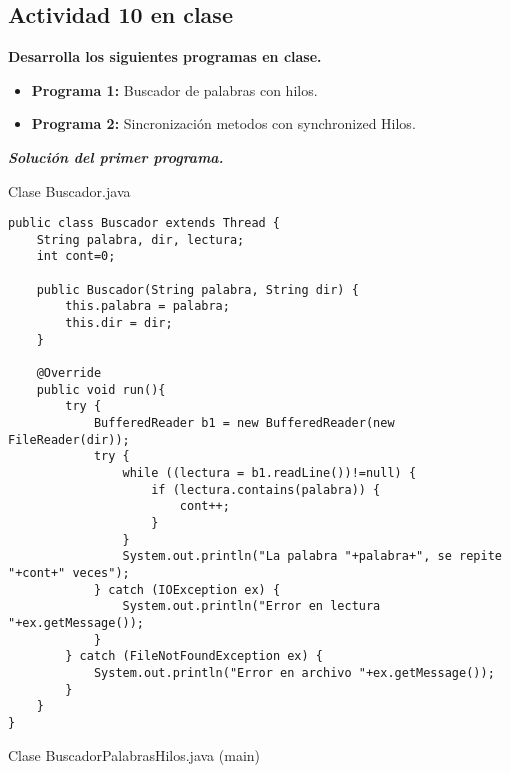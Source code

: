 {\raggedright
\subsection{Actividad 10 en clase}
}\vspace{.5cm}

\textbf{Desarrolla los siguientes programas en clase.}\vspace{.2mm}

\begin{itemize}
\item \textbf{Programa 1:} Buscador de palabras con hilos.
\item \textbf{Programa 2:} Sincronización metodos con synchronized Hilos.
\end{itemize}\vspace{.5cm}

\textbf{\textit{Solución del primer programa.}}

\begin{center}
Clase Buscador.java
\end{center}

\begin{verbatim}
public class Buscador extends Thread {
    String palabra, dir, lectura;
    int cont=0;

    public Buscador(String palabra, String dir) {
        this.palabra = palabra;
        this.dir = dir;
    }
    
    @Override
    public void run(){
        try {
            BufferedReader b1 = new BufferedReader(new FileReader(dir));
            try {
                while ((lectura = b1.readLine())!=null) {
                    if (lectura.contains(palabra)) {
                        cont++;
                    }
                }
                System.out.println("La palabra "+palabra+", se repite "+cont+" veces");
            } catch (IOException ex) {
                System.out.println("Error en lectura "+ex.getMessage());
            }
        } catch (FileNotFoundException ex) {
            System.out.println("Error en archivo "+ex.getMessage());
        }
    }
}
\end{verbatim} \vspace{1cm}\newpage

\begin{center}
Clase BuscadorPalabrasHilos.java (main)
\end{center}

